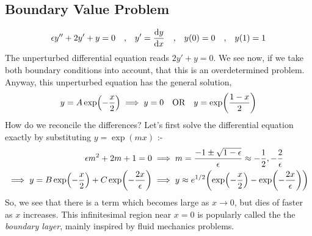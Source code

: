 \documentclass[a4paper,11pt]{article}
\begin{document}
\subsection{Boundary Value Problem}
\begin{equation*}
\epsilon y'' + 2 y' + y = 0 \qq{,} y' = \dv{y}{x} \qq{,} y(0) = 0 \qq{,} y(1)=1
\end{equation*}
The unperturbed differential equation reads $ 2y' + y = 0  $. We see now, if we take both boundary conditions into account, that this is an overdetermined problem. Anyway, this unperturbed equation has the general solution,
\begin{equation*}
y = A \exp(-\dfrac{x}{2}) \implies y = 0 \qq{OR} y = \exp(\dfrac{1-x}{2})
\end{equation*} 
How do we reconcile the differences? Let's first solve the differential equation exactly by substituting $ y = \exp(mx) $ :-
\begin{align*}
\epsilon m^2 + 2m + 1 = 0 &\implies m = \dfrac{-1 \pm \sqrt{1 - \epsilon}}{\epsilon} \approx -\dfrac{1}{2}, -\dfrac{2}{\epsilon} \\
\implies y = B \exp(-\dfrac{x}{2}) +  C \exp(-\dfrac{2x}{\epsilon}) &\implies y \approx e^{1/2} \qty(\exp(-\dfrac{x}{2}) - \exp(-\dfrac{2x}{\epsilon}) )
\end{align*}
So, we see that there is a term which becomes large as $ x\rightarrow 0 $, but dies of faster as $ x $ increases. This infinitesimal region near $x =0 $ is popularly called the the \textit{boundary layer}, mainly inspired by fluid mechanics problems. 
\end{document}
